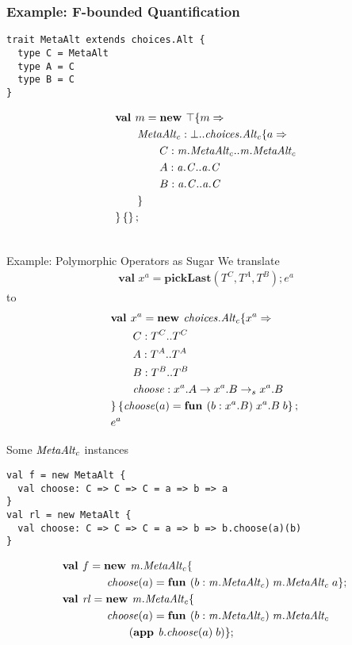 \documentclass{beamer}
\begin{document}
\begin{frame}[fragile]
\frametitle{Example: F-bounded Quantification}
\begin{verbatim}
trait MetaAlt extends choices.Alt {
  type C = MetaAlt
  type A = C
  type B = C
}
\end{verbatim}
\begin{align*}
&\textbf{val }m = \textbf{new }\top \{m \Rightarrow \\
&\quad\quad\mathit{MetaAlt_c} : \bot..{\mathit{choices.Alt_c}} \{a \Rightarrow \\
&\quad\quad\quad\quad C : \mathit{m.MetaAlt_c}..\mathit{m.MetaAlt_c}\\
&\quad\quad\quad\quad A : \mathit{a.C}..\mathit{a.C}\\
&\quad\quad\quad\quad B : \mathit{a.C}..\mathit{a.C}\\
&\quad\quad \}\\
& \}\left\{\right\} ;\;\\&
\end{align*}
\end{frame}

\begin{frame}[fragile]{Example: Polymorphic Operators as Sugar}
We translate
\begin{align*}
\textbf{val } x^a = \textbf{pickLast}(T^C, T^A, T^B); e^a
\end{align*}
to
\begin{align*}
&\textbf{val }x^a = \textbf{new }\mathit{choices.Alt_c} \{x^a \Rightarrow \\
&\quad\quad C : T^C..T^C\\
&\quad\quad A : T^A..T^A\\
&\quad\quad B : T^B..T^B\\
&\quad\quad\mathit{choose} : x^a.A \rightarrow x^a.B\rightarrow_sx^a.B\\
& \}\left\{\mathit{choose}(a)=\textbf{fun } (b:x^a.B)\;x^a.B\;b\right\} ;\;\\&e^a
\end{align*}
\end{frame}

\begin{frame}[fragile]{Some ${\mathit{MetaAlt_c}}$ instances}
\begin{verbatim}
val f = new MetaAlt {
  val choose: C => C => C = a => b => a
}
val rl = new MetaAlt {
  val choose: C => C => C = a => b => b.choose(a)(b)
}
\end{verbatim}
\begin{align*}
&\mlnew f {{\mi{m.MetaAlt_c}}\mlldefs{\\
&\gap\gap\mi{choose}(a)=\fun b {\mi{m.MetaAlt_c}} {\mi{m.MetaAlt_c}} a}}{
\mlnew {\mi{rl}} {{\mi{m.MetaAlt_c}}\mlldefs{\\
&\gap\gap\mi{choose}(a)=\fun b {\mi{m.MetaAlt_c}} {\mi{m.MetaAlt_c}} {\\
&\gap\gap\gap \app {{\mi{b.choose}}(a)} b}}}{
}}
\end{align*}
\end{frame}
\end{document}
